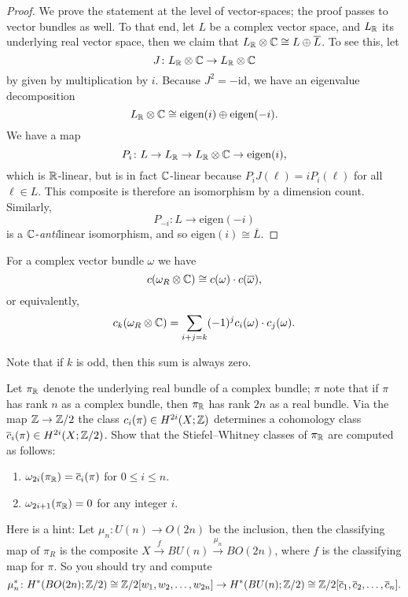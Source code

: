 \documentclass[ma3408.tex]{subfiles}
\begin{document}
\begin{proof}
We prove the statement at the level of vector-spaces; the proof passes to vector bundles as well. To that end, let $L$ be a complex vector space, and $L_{\mathbb{R}}$ its underlying real vector space, then we claim that $L_{\mathbb{R}} \otimes \mathbb{C} \cong L \oplus \overline{L}$. To see this, let 
\[
J \colon L_{\mathbb{R}} \otimes \mathbb{C} \to L_{\mathbb{R}} \otimes \mathbb{C} 
\]
by given by multiplication by $i$. Because $J^2 = -\text{id}$, we have an eigenvalue decomposition
\[
L_{\mathbb{R}} \otimes \mathbb{C} \cong \text{eigen}(i) \oplus \text{eigen}(-i). 
\]
We have a map
\[
P_i \colon L \to L_{\mathbb{R}} \to L_{\mathbb{R}} \otimes \mathbb{C} \to \text{eigen}(i),
\]
which is $\mathbb{R}$-linear, but is in fact $\mathbb{C}$-linear because $P_iJ(\ell) = iP_i(\ell)$ for all $\ell \in L$. This composite is therefore an isomorphism by a dimension count. Similarly, 
\[
P_{-i} \colon L \to \text{eigen}(-i)
\]
is a $\mathbb{C}$-\emph{anti}linear isomorphism, and so $\text{eigen}(i) \cong \overline{L}$. 
\end{proof}
\begin{Cor}
For a complex vector bundle $\omega$ we have
\[
c(\omega_R \otimes \mathbb{C}) \cong c(\omega)\cdot c(\overline{\omega}),
\]
or equivalently,
\[
c_k(\omega_R \otimes\mathbb{C}) = \sum_{i+j = k}(-1)^j c_i(\omega) \cdot c_j(\omega).
\]
\end{Cor}
\begin{Rem}
Note that if $k$ is odd, then this sum is always zero. 
\end{Rem}
\begin{exercise}{}{}
Let $\pi_{\mathbb{R}}$ denote the underlying real bundle of a complex bundle; $\pi$ note that if $\pi$ has rank $n$ as a complex bundle, then $\pi_{\mathbb{R}}$ has rank $2n$ as a real bundle. Via the map $\mathbb{Z} \to \mathbb{Z}/2$ the class $c_i(\pi) \in H^{2i}(X;\mathbb{Z})$ determines a cohomology class $\overline{c}_i(\pi) \in H^{2i}(X;\mathbb{Z}/2)$. Show that the Stiefel--Whitney classes of $\pi_{\mathbb{R}}$ are computed as follows:
\begin{enumerate}
    \item $\omega_{2i}(\pi_{\mathbb{R}}) = \overline{c}_i(\pi)$ for $0 \le i \le n$.
    \item $\omega_{2i+1}(\pi_{\mathbb{R}}) = 0$ for any integer $i$. 
\end{enumerate}
\end{exercise}
\begin{Rem}
Here is a hint: Let $\mu_n \colon U(n) \to O(2n)$ be the inclusion, then the classifying map of $\pi_R$ is the composite $X \xrightarrow{f} BU(n) \xrightarrow{\mu_n} BO(2n)$, where $f$ is the classifying map for $\pi$. So you should try and compute
\[
\mu_n^* \colon H^*(BO(2n);\mathbb{Z}/2)  \cong \mathbb{Z}/2[w_1,w_2,\ldots,w_{2n}] \to H^*(BU(n);\mathbb{Z}/2) \cong \mathbb{Z}/2[\overline{c}_1,\overline{c}_2,\ldots,\overline{c}_n].
\]
\end{Rem}
\end{document}
